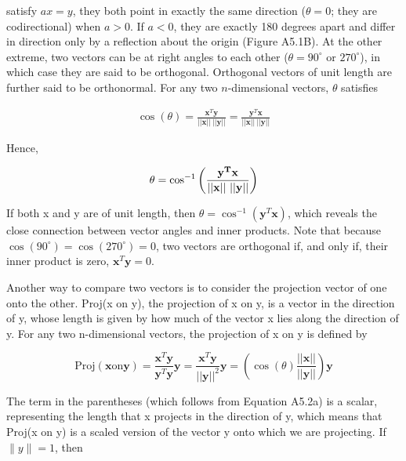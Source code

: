 \documentclass{article}
\begin{document}
satisfy $ax = y$, they both point in exactly the same direction ($\theta = 0$; they are codirectional) when $a > 0$. If $a < 0$, they are exactly 180 degrees apart and differ in direction only by a reflection about the origin (Figure A5.1B). At the other extreme, two vectors can be at right angles to each other ($\theta = 90^\circ$ or $270^\circ$), in which case they are said to be orthogonal. Orthogonal vectors of unit length are further said to be orthonormal. For any two $n$-dimensional vectors, $\theta$ satisfies

\begin{equation}
\begin{align*}\cos(\theta)=\frac{\mathbf{x}^T\mathbf{y}}{||\mathbf{x}||~||\mathbf{y}||}=\frac{\mathbf{y}^T\mathbf{x}}{||\mathbf{x}||~||\mathbf{y}||}\end{align*}
\end{equation}

Hence,

\begin{equation}
\begin{align*}\theta=\cos^{-1}\left({\bf{y}^T\bf{x}\over||\bf{x}||~||\bf{y}||}\right)\end{align*}
\end{equation}

If both x and y are of unit length, then  $ \theta = \cos^{-1}(\mathbf{y}^T\mathbf{x}) $, which reveals the close connection between vector angles and inner products. Note that because  $ \cos(90^\circ) = \cos(270^\circ) = 0 $, two vectors are orthogonal if, and only if, their inner product is zero,  $ \mathbf{x}^T\mathbf{y} = 0 $.

Another way to compare two vectors is to consider the projection vector of one onto the other. Proj(x on y), the projection of x on y, is a vector in the direction of y, whose length is given by how much of the vector x lies along the direction of y. For any two n-dimensional vectors, the projection of x on y is defined by

\begin{equation}
\mathrm{Proj}(\mathbf{x}\mathrm{on}\mathbf{y})=\frac{\mathbf{x}^{T}\mathbf{y}}{\mathbf{y}^{T}\mathbf{y}}\mathbf{y}=\frac{\mathbf{x}^{T}\mathbf{y}}{||\mathbf{y}||^{2}}\mathbf{y}=\left(\cos(\theta)\frac{||\mathbf{x}||}{||\mathbf{y}||}\right)\mathbf{y}
\end{equation}

The term in the parentheses (which follows from Equation A5.2a) is a scalar, representing the length that x projects in the direction of y, which means that Proj(x on y) is a scaled version of the vector y onto which we are projecting. If  $ \|y\| = 1 $, then
\end{document}
